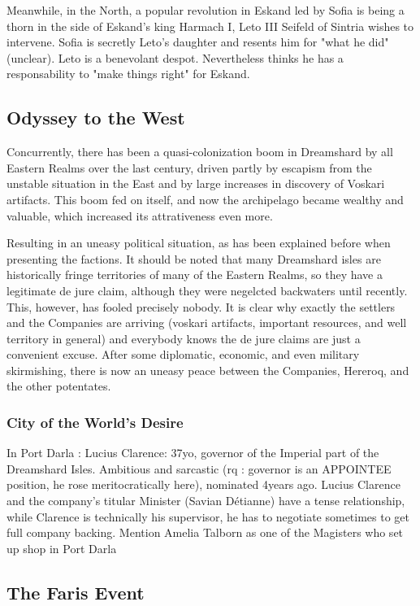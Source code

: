 Meanwhile, in the North, a popular revolution in Eskand led by Sofia is being a thorn in the side of Eskand's king Harmach I, Leto III Seifeld of Sintria wishes to intervene. Sofia is secretly Leto's daughter and resents him for "what he did" (unclear). Leto is a benevolant despot. Nevertheless thinks he has a responsability to "make things right" for Eskand.

\subsection{Odyssey to the West}
 
Concurrently, there has been a quasi-colonization boom in Dreamshard by all Eastern Realms over the last century, driven partly by escapism from the unstable situation in the East and by large increases in discovery of Voskari artifacts. This boom fed on itself, and now the archipelago became wealthy and valuable, which increased its attrativeness even more.

Resulting in an uneasy political situation, as has been explained before when presenting the factions. It should be noted that many Dreamshard isles are historically fringe territories of many of the Eastern Realms, so they have a legitimate de jure claim, although they were negelcted backwaters until recently. This, however, has fooled precisely nobody. It is clear why exactly the settlers and the Companies are arriving (voskari artifacts, important resources, and well territory in general) and everybody knows the de jure claims are just a convenient excuse. After some diplomatic, economic, and even military skirmishing, there is now an uneasy peace between the Companies, Hereroq, and the other potentates.

\subsubsection{City of the World's Desire}

In Port Darla : Lucius Clarence: 37yo, governor of the Imperial part of the Dreamshard Isles. Ambitious and sarcastic (rq : governor is an APPOINTEE position, he rose meritocratically here), nominated 4years ago. Lucius Clarence and the company's titular Minister (Savian Détianne) have a tense relationship, while Clarence is technically his supervisor, he has to negotiate sometimes to get full company backing. Mention Amelia Talborn as one of the Magisters who set up shop in Port Darla

\subsection{The Faris Event}

